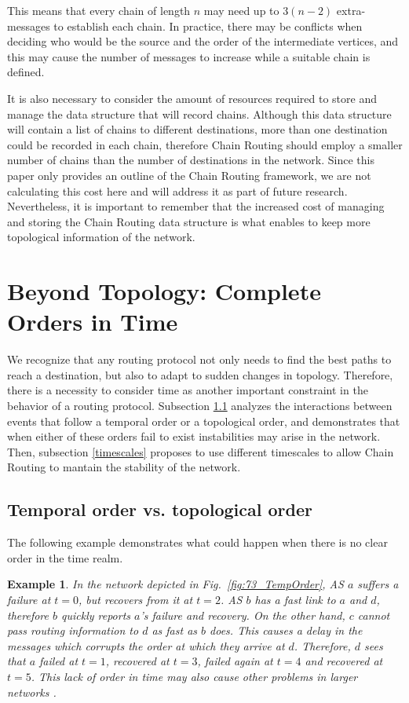 \documentclass[5p,twocolumn]{elsarticle}
\newtheorem{example}{Example}
\begin{document}
This means that every chain of length $n$ may need up to $3(n-2)$ extra-messages to establish each chain. In practice, there may be conflicts when deciding who would be the source and the order of the intermediate vertices, and this may cause the number of messages to increase while a suitable chain is defined.

It is also necessary to consider the amount of resources required to store and manage the data structure that will record chains. Although this data structure will contain a list of chains to different destinations, more than one destination could be recorded in each chain, therefore Chain Routing should employ a smaller number of chains than the number of destinations in the network. Since this paper only provides an outline of the Chain Routing framework, we are not calculating this cost here and will address it as part of future research. Nevertheless, it is important to remember that the increased cost of managing and storing the Chain Routing data structure is what enables to keep more topological information of the network.




\section{Beyond Topology: Complete Orders in Time}\label{comp_orders_in_time}
 
We recognize that any routing protocol not only needs to find the best paths to reach a destination, but also to adapt to sudden changes in topology. Therefore, there is a necessity to consider time as another important constraint in the behavior of a routing protocol. Subsection \ref{temp_ord_topo_ord} analyzes the interactions between events that follow a temporal order or a topological order, and demonstrates that when either of these orders fail to exist instabilities may arise in the network. Then, subsection \ref{timescales} proposes to use different timescales to allow Chain Routing to mantain the stability of the network.


\subsection{Temporal order vs. topological order}\label{temp_ord_topo_ord}

The following example demonstrates what could happen when there is no clear order in the time realm.

\begin{example}
In the network depicted in Fig.\ \ref{fig:73_TempOrder}, AS $a$ suffers a failure at $t=0$, but recovers from it at $t=2$. AS $b$ has a fast link to $a$ and $d$, therefore $b$ quickly reports $a$'s failure and recovery. On the other hand, $c$ cannot pass routing information to $d$ as fast as $b$ does. This causes a delay in the messages which corrupts the order at which they arrive at $d$. Therefore, $d$ sees that $a$ failed at $t=1$, recovered at $t=3$, failed again at $t=4$ and recovered at $t=5$. This lack of order in time may also cause other problems in larger networks \cite{Mao2002}.
\end{example}
\end{document}
